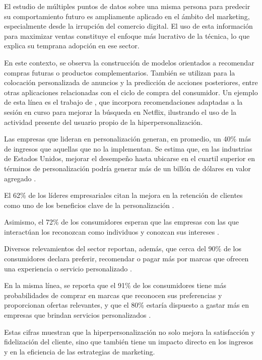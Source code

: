 El estudio de múltiples puntos de datos sobre una misma persona para predecir su comportamiento futuro es ampliamente aplicado en el ámbito del marketing, especialmente desde la irrupción del comercio digital. El uso de esta información para maximizar ventas constituye el enfoque más lucrativo de la técnica, lo que explica su temprana adopción en ese sector.

En este contexto, se observa la construcción de modelos orientados a recomendar compras futuras o productos complementarios. También se utilizan para la colocación personalizada de anuncios y la predicción de acciones posteriores, entre otras aplicaciones relacionadas con el ciclo de compra del consumidor. Un ejemplo de esta línea es el trabajo de \textcite{Bhattacharya2022}, que incorpora recomendaciones adaptadas a la sesión en curso para mejorar la búsqueda en Netflix, ilustrando el uso de la actividad presente del usuario propio de la hiperpersonalización.

Las empresas que lideran en personalización generan, en promedio, un 40\% más de ingresos que aquellas que no la implementan. Se estima que, en las industrias de Estados Unidos, mejorar el desempeño hasta ubicarse en el cuartil superior en términos de personalización podría generar más de un billón de dólares en valor agregado \parencite{McKinsey2021}.

El 62\% de los líderes empresariales citan la mejora en la retención de clientes como uno de los beneficios clave de la personalización \parencite{TwilioSegment2023}.

Asimismo, el 72\% de los consumidores esperan que las empresas con las que interactúan los reconozcan como individuos y conozcan sus intereses \parencite{McKinsey2021}.

Diversos relevamientos del sector reportan, además, que cerca del 90\% de los consumidores declara preferir, recomendar o pagar más por marcas que ofrecen una experiencia o servicio personalizado \parencite{Outgrow2023}.

En la misma línea, se reporta que el 91\% de los consumidores tiene más probabilidades de comprar en marcas que reconocen sus preferencias y proporcionan ofertas relevantes, y que el 80\% estaría dispuesto a gastar más en empresas que brindan servicios personalizados \parencite{Ninetailed2024}.

Estas cifras muestran que la hiperpersonalización no solo mejora la satisfacción y fidelización del cliente, sino que también tiene un impacto directo en los ingresos y en la eficiencia de las estrategias de marketing.


